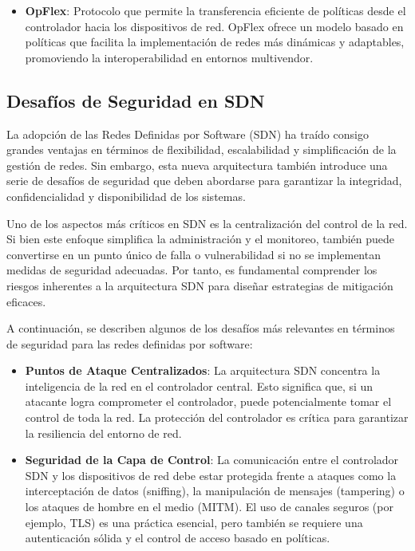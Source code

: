 {\begin{itemize}
                    \item \textbf{OpFlex}: Protocolo que permite la transferencia eficiente de políticas desde el controlador hacia los dispositivos de red. OpFlex ofrece un modelo basado en políticas que facilita la implementación de redes más dinámicas y adaptables, promoviendo la interoperabilidad en entornos multivendor.
                \end{itemize}
            
        \subsection{Desafíos de Seguridad en SDN}
            La adopción de las Redes Definidas por Software (SDN) ha traído consigo grandes ventajas en términos de flexibilidad, escalabilidad y simplificación de la gestión de redes. Sin embargo, esta nueva arquitectura también introduce una serie de desafíos de seguridad que deben abordarse para garantizar la integridad, confidencialidad y disponibilidad de los sistemas.
            
            Uno de los aspectos más críticos en SDN es la centralización del control de la red. Si bien este enfoque simplifica la administración y el monitoreo, también puede convertirse en un punto único de falla o vulnerabilidad si no se implementan medidas de seguridad adecuadas. Por tanto, es fundamental comprender los riesgos inherentes a la arquitectura SDN para diseñar estrategias de mitigación eficaces.
            
            A continuación, se describen algunos de los desafíos más relevantes en términos de seguridad para las redes definidas por software:
            
            \begin{itemize}
                \item \textbf{Puntos de Ataque Centralizados}: La arquitectura SDN concentra la inteligencia de la red en el controlador central. Esto significa que, si un atacante logra comprometer el controlador, puede potencialmente tomar el control de toda la red. La protección del controlador es crítica para garantizar la resiliencia del entorno de red.
            
                \item \textbf{Seguridad de la Capa de Control}: La comunicación entre el controlador SDN y los dispositivos de red debe estar protegida frente a ataques como la interceptación de datos (sniffing), la manipulación de mensajes (tampering) o los ataques de hombre en el medio (MITM). El uso de canales seguros (por ejemplo, TLS) es una práctica esencial, pero también se requiere una autenticación sólida y el control de acceso basado en políticas.
            

\end{itemize}}
